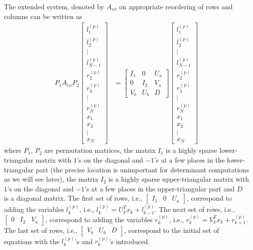 \documentclass[final,leqno]{siamltex}
\begin{document}
The extended system, denoted by $A_{ex}$ on appropriate reordering of rows and columns can be written as
\begin{align}
P_1A_{ex} P_2
\begin{bmatrix}
l_1^{(p)}\\
l_2^{(p)}\\
\vdots\\
l_{N-1}^{(p)}\\
r_2^{(p)}\\
r_3^{(p)}\\
\vdots\\
r_N^{(p)}\\
x_1\\
x_2\\
\vdots\\
x_N
\end{bmatrix} & =
\begin{bmatrix}
I_1 & 0 & U_a\\
0 & I_2 & V_a\\
V_b & U_b & D
\end{bmatrix}
\begin{bmatrix}
l_1^{(p)}\\
l_2^{(p)}\\
\vdots\\
l_{N-1}^{(p)}\\
r_2^{(p)}\\
r_3^{(p)}\\
\vdots\\
r_N^{(p)}\\
x_1\\
x_2\\
\vdots\\
x_N
\end{bmatrix}
\end{align}
where $P_1$, $P_2$ are permutation matrices, the matrix $I_1$ is a highly sparse lower-triangular matrix with $1$'s on the diagonal and $-1$'s at a few places in the lower-triangular part (the precise location is unimportant for determinant computations as we will see later), the matrix $I_2$ is a highly sparse upper-triangular matrix with $1$'s on the diagonal and $-1$'s at a few places in the upper-triangular part and $D$ is a diagonal matrix. The first set of rows, i.e., $\begin{bmatrix} I_1 & 0 & U_a\end{bmatrix}$, correspond to adding the variables $l_k^{(p)}$, i.e., $l_k^{(p)} = U_k^Tx_k + l_{k-1}^{(p)}$. The next set of rows, i.e., $\begin{bmatrix} 0 & I_2 & V_a\end{bmatrix}$, correspond to adding the variables $r_k^{(p)}$, i.e., $r_k^{(p)} = V_k^Tx_k + r_{k+1}^{(p)}$. The last set of rows, i.e., $\begin{bmatrix} V_b & U_b & D\end{bmatrix}$, correspond to the initial set of equations with the $l_k^{(p)}$'s and $r_k^{(p)}$'s introduced.
\end{document}
